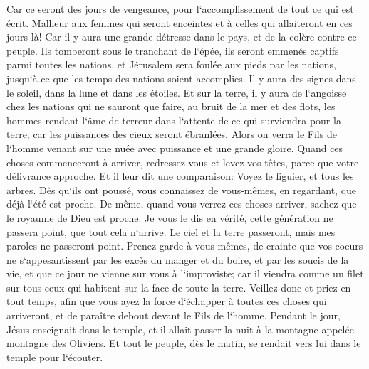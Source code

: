 \verse Car ce seront des jours de vengeance, pour l`accomplissement de tout ce qui est écrit. 
\verse Malheur aux femmes qui seront enceintes et à celles qui allaiteront en ces jours-là! Car il y aura une grande détresse dans le pays, et de la colère contre ce peuple. 
\verse Ils tomberont sous le tranchant de l`épée, ils seront emmenés captifs parmi toutes les nations, et Jérusalem sera foulée aux pieds par les nations, jusqu`à ce que les temps des nations soient accomplies. 
\verse Il y aura des signes dans le soleil, dans la lune et dans les étoiles. Et sur la terre, il y aura de l`angoisse chez les nations qui ne sauront que faire, au bruit de la mer et des flots, 
\verse les hommes rendant l`âme de terreur dans l`attente de ce qui surviendra pour la terre; car les puissances des cieux seront ébranlées. 
\verse Alors on verra le Fils de l`homme venant sur une nuée avec puissance et une grande gloire. 
\verse Quand ces choses commenceront à arriver, redressez-vous et levez vos têtes, parce que votre délivrance approche. 
\verse Et il leur dit une comparaison: Voyez le figuier, et tous les arbres. 
\verse Dès qu`ils ont poussé, vous connaissez de vous-mêmes, en regardant, que déjà l`été est proche. 
\verse De même, quand vous verrez ces choses arriver, sachez que le royaume de Dieu est proche. 
\verse Je vous le dis en vérité, cette génération ne passera point, que tout cela n`arrive. 
\verse Le ciel et la terre passeront, mais mes paroles ne passeront point. 
\verse Prenez garde à vous-mêmes, de crainte que vos coeurs ne s`appesantissent par les excès du manger et du boire, et par les soucis de la vie, et que ce jour ne vienne sur vous à l`improviste; 
\verse car il viendra comme un filet sur tous ceux qui habitent sur la face de toute la terre. 
\verse Veillez donc et priez en tout temps, afin que vous ayez la force d`échapper à toutes ces choses qui arriveront, et de paraître debout devant le Fils de l`homme. 
\verse Pendant le jour, Jésus enseignait dans le temple, et il allait passer la nuit à la montagne appelée montagne des Oliviers. 
\verse Et tout le peuple, dès le matin, se rendait vers lui dans le temple pour l`écouter. 

